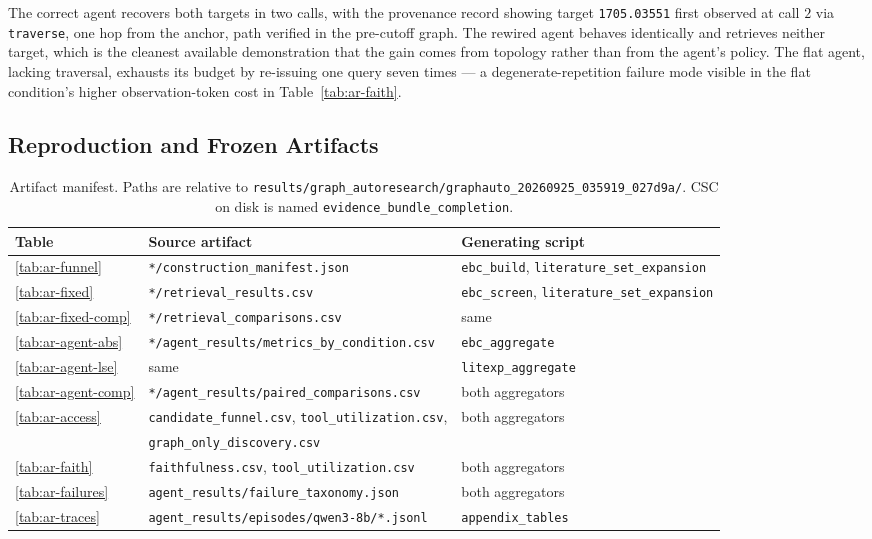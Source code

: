 The correct agent recovers both targets in two calls, with the provenance record showing target
\texttt{1705.03551} first observed at call $2$ via \texttt{traverse}, one hop from the anchor, path
verified in the pre-cutoff graph. The rewired agent behaves identically and retrieves neither
target, which is the cleanest available demonstration that the gain comes from topology rather than
from the agent's policy. The flat agent, lacking traversal, exhausts its budget by re-issuing one
query seven times — a degenerate-repetition failure mode visible in the flat condition's higher
observation-token cost in Table~\ref{tab:ar-faith}.

\subsection{Reproduction and Frozen Artifacts}
\label{appendix:ar-repro}

\begin{table}[t]
\centering
\small
\caption{Artifact manifest. Paths are relative to
\texttt{results/graph\_autoresearch/graphauto\_20260925\_035919\_027d9a/}. CSC on disk is named
\texttt{evidence\_bundle\_completion}.}
\label{tab:ar-manifest}
\begin{tabular}{lll}
\toprule
Table & Source artifact & Generating script \\
\midrule
\ref{tab:ar-funnel} & \texttt{*/construction\_manifest.json} & \texttt{ebc\_build}, \texttt{literature\_set\_expansion} \\
\ref{tab:ar-fixed} & \texttt{*/retrieval\_results.csv} & \texttt{ebc\_screen}, \texttt{literature\_set\_expansion} \\
\ref{tab:ar-fixed-comp} & \texttt{*/retrieval\_comparisons.csv} & same \\
\ref{tab:ar-agent-abs} & \texttt{*/agent\_results/metrics\_by\_condition.csv} & \texttt{ebc\_aggregate} \\
\ref{tab:ar-agent-lse} & same & \texttt{litexp\_aggregate} \\
\ref{tab:ar-agent-comp} & \texttt{*/agent\_results/paired\_comparisons.csv} & both aggregators \\
\ref{tab:ar-access} & \texttt{candidate\_funnel.csv}, \texttt{tool\_utilization.csv}, & both aggregators \\
 & \texttt{graph\_only\_discovery.csv} & \\
\ref{tab:ar-faith} & \texttt{faithfulness.csv}, \texttt{tool\_utilization.csv} & both aggregators \\
\ref{tab:ar-failures} & \texttt{agent\_results/failure\_taxonomy.json} & both aggregators \\
\ref{tab:ar-traces} & \texttt{agent\_results/episodes/qwen3-8b/*.jsonl} & \texttt{appendix\_tables} \\
\bottomrule
\end{tabular}
\end{table}

